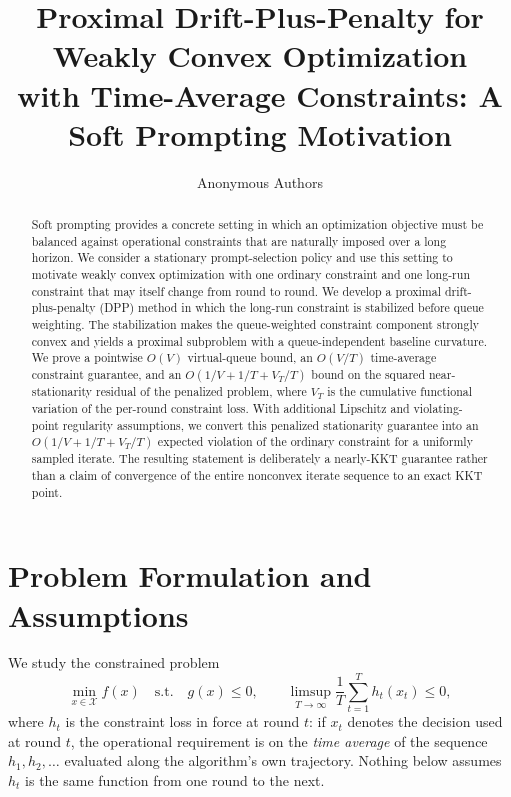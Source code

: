 \documentclass[10pt]{article}
\title{Proximal Drift-Plus-Penalty for Weakly Convex Optimization\\
with Time-Average Constraints: A Soft Prompting Motivation}
\author{Anonymous Authors}
\newcommand{\X}{\mathcal{X}}
\begin{document}
\maketitle


\begin{abstract}
Soft prompting provides a concrete setting in which an optimization
objective must be balanced against operational constraints that are
naturally imposed over a long horizon. We consider a stationary
prompt-selection policy and use this setting to motivate weakly convex
optimization with one ordinary constraint and one long-run constraint that
may itself change from round to round. We develop a proximal
drift-plus-penalty (DPP) method in which the long-run constraint is
stabilized before queue weighting. The stabilization makes the
queue-weighted constraint component strongly convex and yields a proximal
subproblem with a queue-independent baseline curvature. We prove a
pointwise $O(V)$ virtual-queue bound, an $O(V/T)$ time-average constraint
guarantee, and an $O(1/V+1/T+V_T/T)$ bound on the squared
near-stationarity residual of the penalized problem, where $V_T$ is the
cumulative functional variation of the per-round constraint loss. With
additional Lipschitz and violating-point regularity assumptions, we
convert this penalized stationarity guarantee into an
$O(1/V+1/T+V_T/T)$ expected violation of the ordinary constraint for a
uniformly sampled iterate. The resulting statement is deliberately a
nearly-KKT guarantee rather than a claim of convergence of the entire
nonconvex iterate sequence to an exact KKT point.
\end{abstract}

\section{Problem Formulation and Assumptions}
\label{sec:problem}

We study the constrained problem
\begin{equation}
\min_{x\in\X} f(x)
\quad\text{s.t.}\quad
g(x)\leq0,
\qquad
\limsup_{T\to\infty}\frac1T\sum_{t=1}^T h_t(x_t)\leq0,
\label{eq:main-problem}
\end{equation}
where $h_t$ is the constraint loss in force at round $t$: if $x_t$ denotes
the decision used at round $t$, the operational requirement is on the
\emph{time average} of the sequence $h_1,h_2,\ldots$ evaluated along the
algorithm's own trajectory. Nothing below assumes $h_t$ is the same
function from one round to the next.
\end{document}
